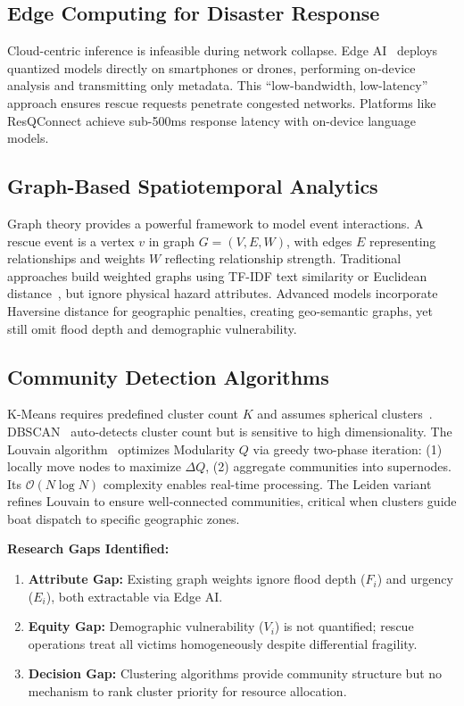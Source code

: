 \documentclass[runningheads]{llncs}
\begin{document}
\subsection{Edge Computing for Disaster Response}

Cloud-centric inference is infeasible during network collapse. Edge AI~\cite{kyrkou2020emergencynet,duan2021lightweight} deploys quantized models directly on smartphones or drones, performing on-device analysis and transmitting only metadata. This ``low-bandwidth, low-latency'' approach ensures rescue requests penetrate congested networks. Platforms like ResQConnect achieve sub-500ms response latency with on-device language models.

\subsection{Graph-Based Spatiotemporal Analytics}

Graph theory provides a powerful framework to model event interactions. A rescue event is a vertex $v$ in graph $G = (V, E, W)$, with edges $E$ representing relationships and weights $W$ reflecting relationship strength. Traditional approaches build weighted graphs using TF-IDF text similarity or Euclidean distance~\cite{blondel2008louvain}, but ignore physical hazard attributes. Advanced models incorporate Haversine distance for geographic penalties, creating geo-semantic graphs, yet still omit flood depth and demographic vulnerability.

\subsection{Community Detection Algorithms}

K-Means requires predefined cluster count $K$ and assumes spherical clusters~\cite{ester1996dbscan}. DBSCAN~\cite{birant2007stdbscan} auto-detects cluster count but is sensitive to high dimensionality. The Louvain algorithm~\cite{blondel2008louvain} optimizes Modularity $Q$ via greedy two-phase iteration: (1) locally move nodes to maximize $\Delta Q$, (2) aggregate communities into supernodes. Its $\mathcal{O}(N \log N)$ complexity enables real-time processing. The Leiden variant~\cite{traag2019leiden} refines Louvain to ensure well-connected communities, critical when clusters guide boat dispatch to specific geographic zones.

\textbf{Research Gaps Identified:}
\begin{enumerate}
\item \textbf{Attribute Gap:} Existing graph weights ignore flood depth ($F_i$) and urgency ($E_i$), both extractable via Edge AI.
\item \textbf{Equity Gap:} Demographic vulnerability ($V_i$) is not quantified; rescue operations treat all victims homogeneously despite differential fragility.
\item \textbf{Decision Gap:} Clustering algorithms provide community structure but no mechanism to rank cluster priority for resource allocation.
\end{enumerate}
\end{document}
